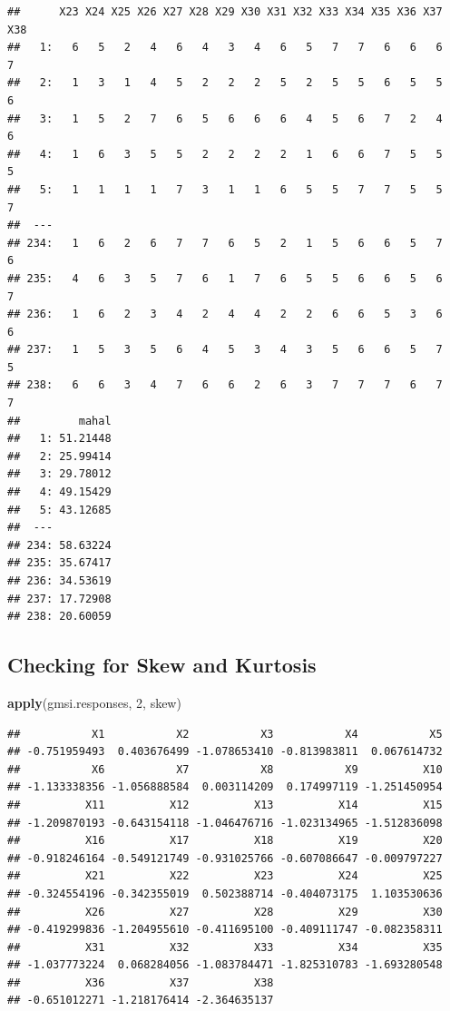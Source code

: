\documentclass[]{book}
\newenvironment{Shaded}{\begin{snugshade}}{\end{snugshade}}
\newcommand{\KeywordTok}[1]{\textcolor[rgb]{0.13,0.29,0.53}{\textbf{#1}}}
\newcommand{\DecValTok}[1]{\textcolor[rgb]{0.00,0.00,0.81}{#1}}
\newcommand{\NormalTok}[1]{#1}
\theoremstyle{definition}
\theoremstyle{definition}
\theoremstyle{definition}
\theoremstyle{remark}
\begin{document}
\begin{verbatim}
##      X23 X24 X25 X26 X27 X28 X29 X30 X31 X32 X33 X34 X35 X36 X37 X38
##   1:   6   5   2   4   6   4   3   4   6   5   7   7   6   6   6   7
##   2:   1   3   1   4   5   2   2   2   5   2   5   5   6   5   5   6
##   3:   1   5   2   7   6   5   6   6   6   4   5   6   7   2   4   6
##   4:   1   6   3   5   5   2   2   2   2   1   6   6   7   5   5   5
##   5:   1   1   1   1   7   3   1   1   6   5   5   7   7   5   5   7
##  ---                                                                
## 234:   1   6   2   6   7   7   6   5   2   1   5   6   6   5   7   6
## 235:   4   6   3   5   7   6   1   7   6   5   5   6   6   5   6   7
## 236:   1   6   2   3   4   2   4   4   2   2   6   6   5   3   6   6
## 237:   1   5   3   5   6   4   5   3   4   3   5   6   6   5   7   5
## 238:   6   6   3   4   7   6   6   2   6   3   7   7   7   6   7   7
##         mahal
##   1: 51.21448
##   2: 25.99414
##   3: 29.78012
##   4: 49.15429
##   5: 43.12685
##  ---         
## 234: 58.63224
## 235: 35.67417
## 236: 34.53619
## 237: 17.72908
## 238: 20.60059
\end{verbatim}

\subsection{Checking for Skew and
Kurtosis}\label{checking-for-skew-and-kurtosis}

\begin{Shaded}
\begin{Highlighting}[]
\KeywordTok{apply}\NormalTok{(gmsi.responses, }\DecValTok{2}\NormalTok{, skew)}
\end{Highlighting}
\end{Shaded}

\begin{verbatim}
##           X1           X2           X3           X4           X5 
## -0.751959493  0.403676499 -1.078653410 -0.813983811  0.067614732 
##           X6           X7           X8           X9          X10 
## -1.133338356 -1.056888584  0.003114209  0.174997119 -1.251450954 
##          X11          X12          X13          X14          X15 
## -1.209870193 -0.643154118 -1.046476716 -1.023134965 -1.512836098 
##          X16          X17          X18          X19          X20 
## -0.918246164 -0.549121749 -0.931025766 -0.607086647 -0.009797227 
##          X21          X22          X23          X24          X25 
## -0.324554196 -0.342355019  0.502388714 -0.404073175  1.103530636 
##          X26          X27          X28          X29          X30 
## -0.419299836 -1.204955610 -0.411695100 -0.409111747 -0.082358311 
##          X31          X32          X33          X34          X35 
## -1.037773224  0.068284056 -1.083784471 -1.825310783 -1.693280548 
##          X36          X37          X38 
## -0.651012271 -1.218176414 -2.364635137
\end{verbatim}
\end{document}
